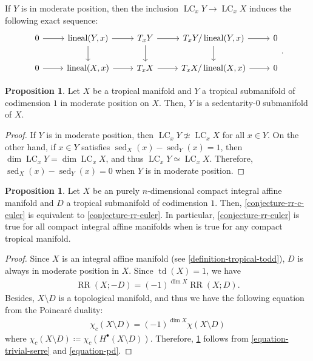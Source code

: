 \documentclass[a4paper,dvipdfmx,reqno,12pt]{amsart}
\theoremstyle{definition}
\newtheorem{proposition}[theorem]{Proposition}
\newcommand{\deq}{\coloneqq}
\newcommand{\opn}[1]{\operatorname{#1}}
\numberwithin{equation}{section}
\begin{document}
If $Y$ is in moderate position, then
the inclusion 
$\opn{LC}_x Y\to \opn{LC}_x X$ induces the following 
exact sequence:
\[\begin{tikzcd}
	0 & {\opn{lineal}(Y,x)} & {T_x Y} & {T_x Y/\opn{lineal}(Y,x)} & 0 \\
	0 & {\opn{lineal}(X,x)} & {T_x X} & 
{T_x X/\opn{lineal}(X,x)} & 0
	\arrow[from=1-1, to=1-2]
	\arrow[from=2-1, to=2-2]
	\arrow[from=2-3, to=2-4]
	\arrow[from=1-3, to=1-4]
	\arrow[from=1-4, to=2-4]
	\arrow[from=1-2, to=2-2]
	\arrow[from=1-2, to=1-3]
	\arrow[from=2-2, to=2-3]
	\arrow[from=1-3, to=2-3]
	\arrow[from=2-4, to=2-5]
	\arrow[from=1-4, to=1-5]
\end{tikzcd}.\]

\begin{proposition}
Let $X$ be a tropical manifold and 
$Y$ a tropical submanifold of codimension $1$
in moderate position on $X$.
Then, $Y$ is a sedentarity-0 submanifold of $X$.
\end{proposition}
\begin{proof}
If $Y$ is in moderate position,
then $\opn{LC}_x Y\not \simeq \opn{LC}_x X$ for all 
$x \in Y$.
On the other hand, if $x \in Y$ satisfies 
$\opn{sed}_X(x)-\opn{sed}_Y(x)=1$, then
$\dim \opn{LC}_x Y=\dim \opn{LC}_x X$,
and thus $\opn{LC}_x Y\simeq \opn{LC}_x X$.
Therefore, $\opn{sed}_X(x)-\opn{sed}_Y(x)=0$ when
$Y$ is in moderate position. 
\end{proof}


\begin{proposition}
\label{proposition-divisor-poincare}
Let $X$ be an purely 
$n$-dimensional compact integral
affine manifold and $D$ a tropical submanifold 
of codimension $1$.
Then, \cref{conjecture-rr-c-euler} is 
equivalent to
\cref{conjecture-rr-euler}. In particular,
\cref{conjecture-rr-euler} is true for
all compact integral affine manifolds when
\cite[Conjecture 6.13]{demedrano2023chern} is
true for any compact tropical manifold.
\end{proposition}
\begin{proof}
Since $X$ is an integral affine manifold
(see \cref{definition-tropical-todd}),
$D$ is always in moderate position in $X$.
Since $\opn{td}(X)=1$, we have
\begin{align}
\label{equation-trivial-serre}
\opn{RR}(X;-D)=(-1)^{\dim X}\opn{RR}(X;D).
\end{align}
Besides, $X\setminus D$ is a topological manifold, 
and thus we have the following equation from 
the Poincar\'e duality:
\begin{align}
\label{equation-pd}
\chi_c(X\setminus D)=(-1)^{\dim X}\chi(X\setminus D)
\end{align}
where $\chi_c(X\setminus D)\deq 
\chi_c(H^{\bullet}(X\setminus D))$.
Therefore, \cref{proposition-divisor-poincare} follows from
\cref{equation-trivial-serre} and
\cref{equation-pd}.
\end{proof}
\end{document}
